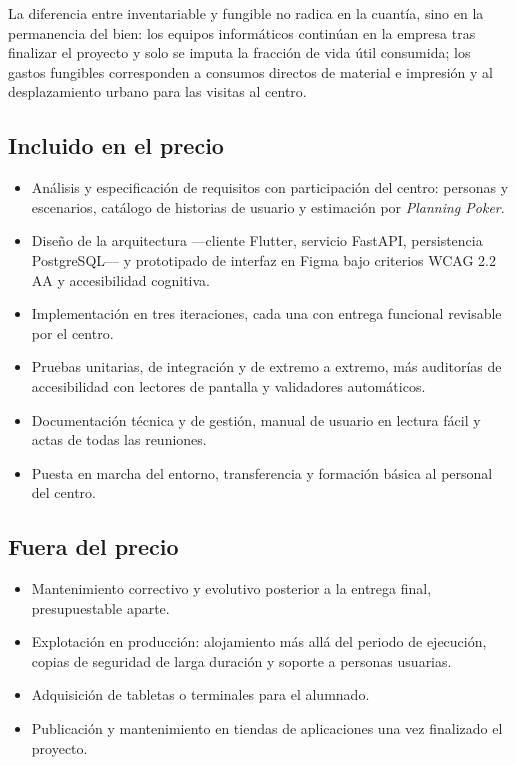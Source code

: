 \documentclass[a4paper,10pt]{article}
\begin{document}
\vspace{0.4cm}
\noindent La diferencia entre inventariable y fungible no radica en la cuantía, sino en la permanencia del bien: los equipos informáticos continúan en la empresa tras finalizar el proyecto y solo se imputa la fracción de vida útil consumida; los gastos fungibles corresponden a consumos directos de material e impresión y al desplazamiento urbano para las visitas al centro.


\newpage
\subsection{Incluido en el precio}
\begin{itemize}[leftmargin=1.2em, itemsep=2pt, topsep=4pt]
  \item Análisis y especificación de requisitos con participación del centro: personas y escenarios, catálogo de historias de usuario y estimación por \textit{Planning Poker}.
  \item Diseño de la arquitectura ---cliente Flutter, servicio FastAPI, persistencia PostgreSQL--- y prototipado de interfaz en Figma bajo criterios WCAG 2.2 AA y accesibilidad cognitiva.
  \item Implementación en tres iteraciones, cada una con entrega funcional revisable por el centro.
  \item Pruebas unitarias, de integración y de extremo a extremo, más auditorías de accesibilidad con lectores de pantalla y validadores automáticos.
  \item Documentación técnica y de gestión, manual de usuario en lectura fácil y actas de todas las reuniones.
  \item Puesta en marcha del entorno, transferencia y formación básica al personal del centro.
\end{itemize}

\subsection{Fuera del precio}
\begin{itemize}[leftmargin=1.2em, itemsep=2pt, topsep=4pt]
  \item Mantenimiento correctivo y evolutivo posterior a la entrega final, presupuestable aparte.
  \item Explotación en producción: alojamiento más allá del periodo de ejecución, copias de seguridad de larga duración y soporte a personas usuarias.
  \item Adquisición de tabletas o terminales para el alumnado.
  \item Publicación y mantenimiento en tiendas de aplicaciones una vez finalizado el proyecto.
\end{itemize}
\end{document}
